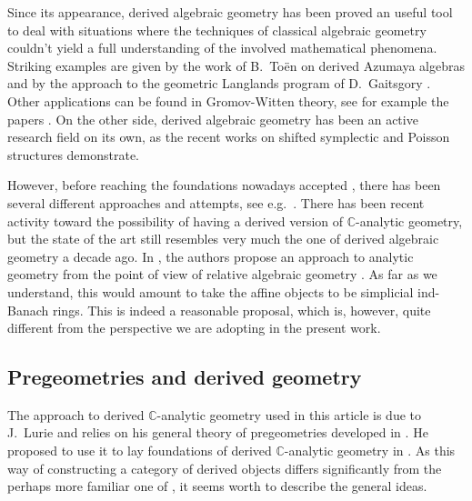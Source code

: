 \documentclass[12pt,a4paper,reqno]{amsart}
\theoremstyle{plain}
\theoremstyle{definition}
\theoremstyle{remark}
\numberwithin{equation}{section}
\begin{document}
Since its appearance, derived algebraic geometry has been proved an useful tool to deal with situations where the techniques of classical algebraic geometry couldn't yield a full understanding of the involved mathematical phenomena.
Striking examples are given by the work of B.\ To\"en on derived Azumaya algebras \cite{Toen_Derived_Azumaya_2012} and by the approach to the geometric Langlands program of D.\ Gaitsgory \cite{Gaitsgory_Outline}. Other applications can be found in Gromov-Witten theory, see for example the papers \cite{Schurg_Toen_Determinants_2015, Mann_Robalo_GW_invariants_2015}.
On the other side, derived algebraic geometry has been an active research field on its own, as the recent works on shifted symplectic and Poisson structures \cite{Pantev_Toen_Shifted_symplectic_2013, Toen_Vezzosi_Shifted_Poisson_2015} demonstrate.

However, before reaching the foundations nowadays accepted \cite{HAG-II, DAG-V, DAG-VII, DAG-VIII}, there has been several different approaches and attempts, see e.g.\ \cite{Kapranov_Derived_Quot_2001}. There has been recent activity toward the possibility of having a derived version of {$\mathbb C$-analytic\xspace} geometry, but the state of the art still resembles very much the one of derived algebraic geometry a decade ago.
In \cite{Ben-Bassat_Non-archimedean_2013}, the authors propose an approach to analytic geometry from the point of view of relative algebraic geometry \cite{Toen_Vaquie_Under_SpecZ}. As far as we understand, this would amount to take the affine objects to be simplicial ind-Banach rings. This is indeed a reasonable proposal, which is, however, quite different from the perspective we are adopting in the present work.

\subsection*{Pregeometries and derived geometry}

The approach to derived {$\mathbb C$-analytic\xspace} geometry used in this article is due to J.\ Lurie and relies on his general theory of pregeometries developed in \cite{DAG-V}.
He proposed to use it to lay foundations of derived {$\mathbb C$-analytic\xspace} geometry in \cite[Â§11, Â§12]{DAG-IX}.
As this way of constructing a category of derived objects differs significantly from the perhaps more familiar one of \cite{HAG-II}, it seems worth to describe the general ideas.
\end{document}
